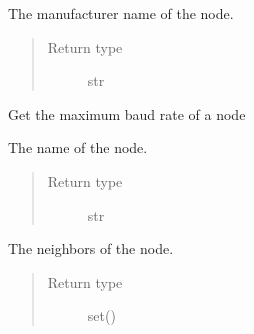 \documentclass[letterpaper,10pt,english]{sphinxmanual}
\begin{document}
\begin{fulllineitems}
\begin{fulllineitems}
\label{node:openzwave.node.ZWaveNode.manufacturer_name}
The manufacturer name of the node.
\begin{quote}\begin{description}
\item[{Return type}] \leavevmode
str

\end{description}\end{quote}

\end{fulllineitems}


\begin{fulllineitems}
\label{node:openzwave.node.ZWaveNode.max_baud_rate}
Get the maximum baud rate of a node

\end{fulllineitems}


\begin{fulllineitems}
\label{node:openzwave.node.ZWaveNode.name}
The name of the node.
\begin{quote}\begin{description}
\item[{Return type}] \leavevmode
str

\end{description}\end{quote}

\end{fulllineitems}


\begin{fulllineitems}
\label{node:openzwave.node.ZWaveNode.neighbors}
The neighbors of the node.
\begin{quote}\begin{description}
\item[{Return type}] \leavevmode
set()

\end{description}\end{quote}

\end{fulllineitems}


\end{fulllineitems}
\end{document}
